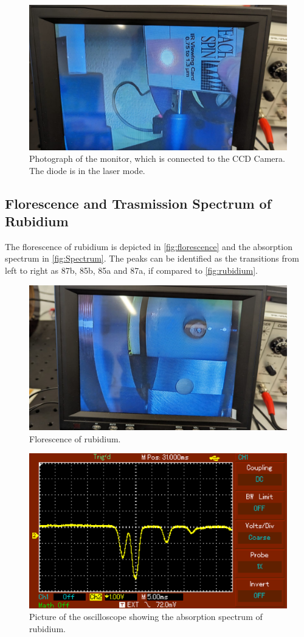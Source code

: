 \begin{figure}[H]
    \centering
    \includegraphics[width=\textwidth]{data/01.pdf}
    \caption{Photograph of the monitor, which is connected to the CCD Camera. The diode is in the laser mode.}
    \label{fig:laser}
\end{figure}


\subsection{Florescence and Trasmission Spectrum  of Rubidium}

The florescence of rubidium is depicted in \autoref{fig:florescence} and the absorption spectrum in \autoref{fig:Spectrum}.
The peaks can be identified as the transitions from left to right as 87b, 85b, 85a and 87a, if compared to \autoref{fig:rubidium}.

\begin{figure}[H]
    \centering
    \includegraphics[width=\textwidth]{data/06.pdf}
    \caption{Florescence of rubidium.}
    \label{fig:laser}
\end{figure}

\begin{figure}[H]
    \centering
    \includegraphics[width=\textwidth]{data/5.pdf}
    \caption{Picture of the oscilloscope showing the absorption spectrum of rubidium.}
    \label{fig:Spectrum}
\end{figure}
